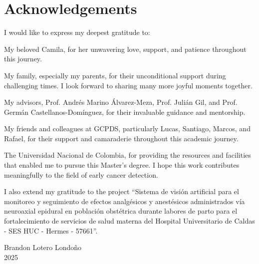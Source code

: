 \cleardoublepage
\chapter*{Acknowledgements}

I would like to express my deepest gratitude to:

My beloved Camila, for her unwavering love, support, and patience
throughout this journey.

My family, especially my parents, for their unconditional support
during challenging times. I look forward to sharing many more joyful
moments together.

My advisors, Prof. Andrés Marino Álvarez-Meza, Prof. Julián Gil, and
Prof. Germán Castellanos-Domínguez, for their invaluable guidance and
mentorship.

My friends and colleagues at GCPDS, particularly Lucas, Santiago,
Marcos, and Rafael, for their support and camaraderie throughout this
academic journey.

The Universidad Nacional de Colombia, for providing the resources and
facilities that enabled me to pursue this Master's degree. I hope
this work contributes meaningfully to the field of early cancer detection.

I also extend my gratitude to the project ``Sistema de visión artificial para el
monitoreo y seguimiento de efectos analgésicos y anestésicos
administrados vía neuroaxial epidural en población obstétrica durante
labores de parto para el fortalecimiento de servicios de salud
materna del Hospital Universitario de Caldas - SES HUC - Hermes - 57661''.

\begin{flushright}
  Brandon Lotero Londoño\\
  2025
\end{flushright}